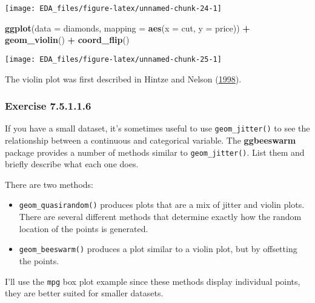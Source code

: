 \documentclass[]{book}
\newenvironment{Shaded}{\begin{snugshade}}{\end{snugshade}}
\newcommand{\DataTypeTok}[1]{\textcolor[rgb]{0.13,0.29,0.53}{#1}}
\newcommand{\KeywordTok}[1]{\textcolor[rgb]{0.13,0.29,0.53}{\textbf{#1}}}
\newcommand{\NormalTok}[1]{#1}
\newcommand{\OperatorTok}[1]{\textcolor[rgb]{0.81,0.36,0.00}{\textbf{#1}}}
\newcommand{\StringTok}[1]{\textcolor[rgb]{0.31,0.60,0.02}{#1}}
\providecommand{\tightlist}{%
  \setlength{\itemsep}{0pt}\setlength{\parskip}{0pt}}
\theoremstyle{plain}
\theoremstyle{remark}
\begin{document}
\begin{center}\texttt{[image: EDA\_files/figure-latex/unnamed-chunk-24-1]} \end{center}

\begin{Shaded}
\begin{Highlighting}[]
\KeywordTok{ggplot}\NormalTok{(}\DataTypeTok{data =}\NormalTok{ diamonds, }\DataTypeTok{mapping =} \KeywordTok{aes}\NormalTok{(}\DataTypeTok{x =}\NormalTok{ cut, }\DataTypeTok{y =}\NormalTok{ price)) }\OperatorTok{+}
\StringTok{  }\KeywordTok{geom_violin}\NormalTok{() }\OperatorTok{+}
\StringTok{  }\KeywordTok{coord_flip}\NormalTok{()}
\end{Highlighting}
\end{Shaded}

\begin{center}\texttt{[image: EDA\_files/figure-latex/unnamed-chunk-25-1]} \end{center}

The violin plot was first described in Hintze and Nelson
(\protect\hyperlink{ref-HintzeNelson1998}{1998}).

\hypertarget{exercise-7.5.1.1.6}{%
\subsubsection*{\texorpdfstring{Exercise
{7.5.1.1.6}}{Exercise 7.5.1.1.6}}\label{exercise-7.5.1.1.6}}

If you have a small dataset, it's sometimes useful to use
\texttt{geom\_jitter()} to see the relationship between a continuous and
categorical variable. The \textbf{ggbeeswarm} package provides a number
of methods similar to \texttt{geom\_jitter()}. List them and briefly
describe what each one does.

There are two methods:

\begin{itemize}
\tightlist
\item
  \texttt{geom\_quasirandom()} produces plots that are a mix of jitter
  and violin plots. There are several different methods that determine
  exactly how the random location of the points is generated.
\item
  \texttt{geom\_beeswarm()} produces a plot similar to a violin plot,
  but by offsetting the points.
\end{itemize}

I'll use the \texttt{mpg} box plot example since these methods display
individual points, they are better suited for smaller datasets.
\end{document}
